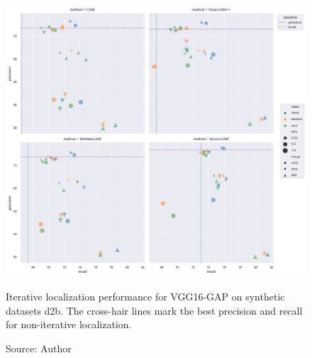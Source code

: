 \begin{figure}[ht]
    \begin{center}       
    \includegraphics[width=1.0\textwidth]{images/fig_iter_vgg16_gap_syn_d2b.png}
    \caption[Iterative localization performance for VGG16-GAP on synthetic dataset d2b]{Iterative localization performance for VGG16-GAP on synthetic datasets d2b. The cross-hair lines mark the best precision and recall for non-iterative localization.}
    \caption*{Source: Author}
    \label{fig:prec_iter_vgg16_gap_syn_d2b}
    \end{center}
\end{figure}

